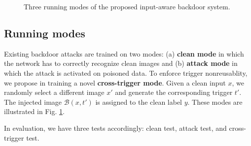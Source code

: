 \documentclass{article}
\begin{document}
\begin{figure}[t]
\centering
{}
\hspace{2mm}
\hspace{2mm}

\caption{Three running modes of the proposed input-aware backdoor system.}
\label{fig:modes}
\end{figure}
 
\subsection{Running modes}
Existing backdoor attacks are trained on two modes: (a) \textbf{clean mode} in which the network has to correctly recognize clean images and (b) \textbf{attack mode} in which the attack is activated on poisoned data. To enforce trigger nonreusablity, we propose in training a novel \textbf{cross-trigger mode}. Given a clean input $x$, we randomly select a different image $x'$ and generate the corresponding trigger $t'$. The injected image $\mathcal{B}(x,t')$ is assigned to the clean label $y$. These modes are illustrated in Fig. \ref{fig:modes}.

In evaluation, we have three tests accordingly: clean test, attack test, and cross-trigger test.
\end{document}
